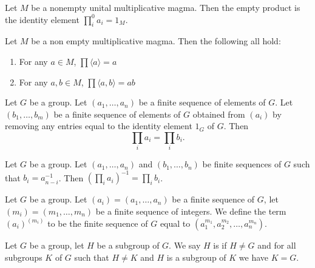 \begin{theorem}
Let $M$ be a nonempty unital multiplicative magma.
Then the empty product is the identity element
$\prod^{0}_{i}a_{i}=1_{M}$.
\end{theorem}

\begin{theorem}
Let $M$ be a non empty multiplicative magma.
Then the following all hold:
\begin{enumerate}
\item{} For any $a\in M$, $\prod\langle a\rangle=a$
\item{} For any $a,b\in M$, $\prod\langle a,b\rangle=ab$
\end{enumerate}
\end{theorem}

\begin{theorem}
Let $G$ be a group.
Let $(a_{1},\dots,a_{n})$ be a finite sequence of elements of $G$.
Let $(b_{1},\dots,b_{m})$ be a finite sequence of elements of $G$
obtained from $(a_{i})$ by removing any entries equal to the identity
element $1_{G}$ of $G$. Then
\begin{equation*}
\prod_{i}a_{i}=\prod_{i}b_{i}.
\end{equation*}
\end{theorem}

\begin{theorem}
Let $G$ be a group. Let $(a_{1},\dots,a_{n})$ and
$(b_{1},\dots,b_{n})$ be finite sequences of $G$ such that $b_{i}=a_{n-i}^{-1}$.
Then $(\prod_{i}a_{i})^{-1}=\prod_{i}b_{i}$.
\end{theorem}

\begin{definition}
Let $G$ be a group.
Let $(a_{i})=(a_{1},\dots,a_{n})$ be a finite sequence of $G$,
let $(m_{i})=(m_{1},\dots,m_{n})$ be a finite sequence of integers.
We define the term $(a_{i})^{(m_{i})}$ to be the finite sequence of
$G$ equal to $(a_{1}^{m_{1}},a_{2}^{m_{2}},\dots,a_{n}^{m_{n}})$.
\end{definition}

\begin{definition}
Let $G$ be a group, let $H$ be a subgroup of $G$.
We say $H$ is  if $H\neq G$ and for all subgroups $K$
of $G$ such that $H\neq K$ and $H$ is a subgroup of $K$ we have $K=G$.
\end{definition}

